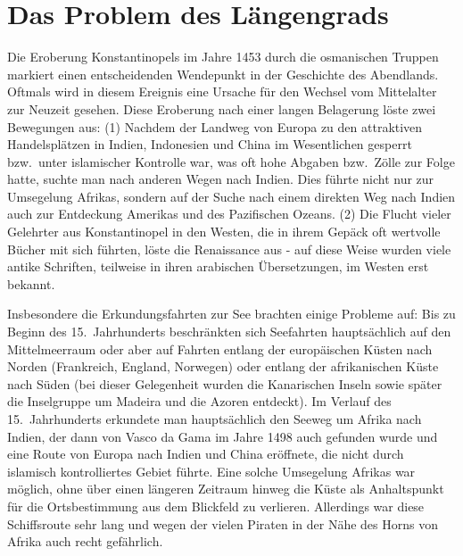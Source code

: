 \section{Das Problem des L\"angengrads}

Die Eroberung Konstantinopels 
im Jahre 1453 durch die osmanischen Truppen markiert einen
entscheidenden Wendepunkt in der Geschichte des Abendlands. Oftmals wird in diesem Ereignis eine 
Ursache f\"ur den Wechsel vom Mittelalter zur Neuzeit gesehen. Diese Eroberung nach einer
langen Belagerung l\"oste zwei Bewegungen aus:
(1) Nachdem der Landweg von Europa zu den attraktiven Handelspl\"atzen in Indien, 
Indonesien und China im Wesentlichen gesperrt bzw.\ unter islamischer Kontrolle war, was oft
hohe Abgaben bzw.\ Z\"olle zur Folge hatte,
suchte man nach anderen Wegen nach Indien. Dies f\"uhrte nicht nur zur Umsegelung Afrikas,
sondern auf der Suche nach einem direkten Weg nach Indien auch zur Entdeckung Amerikas und
des Pazifischen Ozeans. (2) Die Flucht vieler Gelehrter aus Konstantinopel in den Westen,
die in ihrem Gep\"ack oft wertvolle B\"ucher mit sich f\"uhrten, l\"oste die
Renaissance aus - auf diese Weise wurden viele antike Schriften, teilweise in ihren
arabischen \"Ubersetzungen, im Westen erst bekannt.  

Insbesondere die Erkundungsfahrten zur See brachten einige Probleme auf: Bis zu Beginn
des 15.\ Jahrhunderts beschr\"ankten sich Seefahrten haupts\"achlich auf den Mittelmeerraum
oder aber auf Fahrten entlang der europ\"aischen K\"usten nach Norden (Frankreich, England, 
Norwegen) oder entlang der afrikanischen K\"uste nach S\"uden (bei dieser Gelegenheit wurden
die Kanarischen Inseln sowie sp\"ater die Inselgruppe um Madeira und die Azoren entdeckt). Im Verlauf
des 15.\ Jahrhunderts erkundete man haupts\"achlich den Seeweg um Afrika nach Indien, der
dann von Vasco da Gama 
im Jahre 1498 auch gefunden wurde und eine Route von
Europa nach Indien und China er\"offnete, die nicht durch islamisch
kontrolliertes Gebiet f\"uhrte. Eine solche Umsegelung Afrikas war
m\"oglich, ohne \"uber einen l\"angeren Zeitraum hinweg die K\"uste als Anhaltspunkt f\"ur die
Ortsbestimmung aus dem Blickfeld zu verlieren. Allerdings war diese Schiffsroute sehr lang
und wegen der vielen Piraten in der N\"ahe des Horns von Afrika auch recht gef\"ahrlich.

